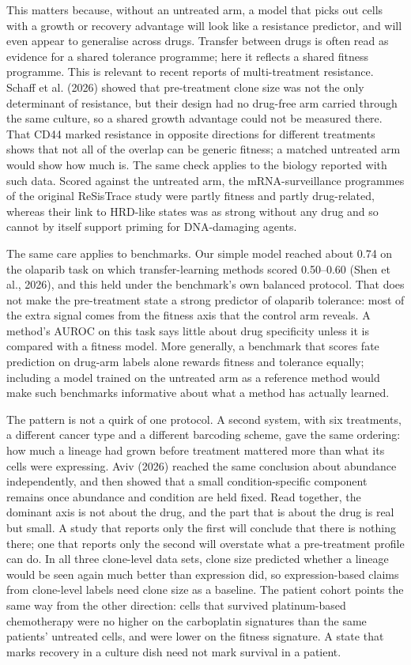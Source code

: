 \documentclass[11pt,a4paper]{article}
\begin{document}
This matters because, without an untreated arm, a model that picks out cells with a growth or recovery advantage will look like a resistance predictor, and will even appear to generalise across drugs. Transfer between drugs is often read as evidence for a shared tolerance programme; here it reflects a shared fitness programme. This is relevant to recent reports of multi-treatment resistance. Schaff et al. (2026) showed that pre-treatment clone size was not the only determinant of resistance, but their design had no drug-free arm carried through the same culture, so a shared growth advantage could not be measured there. That CD44 marked resistance in opposite directions for different treatments shows that not all of the overlap can be generic fitness; a matched untreated arm would show how much is. The same check applies to the biology reported with such data. Scored against the untreated arm, the mRNA-surveillance programmes of the original ReSisTrace study were partly fitness and partly drug-related, whereas their link to HRD-like states was as strong without any drug and so cannot by itself support priming for DNA-damaging agents.

The same care applies to benchmarks. Our simple model reached about 0.74 on the olaparib task on which transfer-learning methods scored 0.50--0.60 (Shen et al., 2026), and this held under the benchmark's own balanced protocol. That does not make the pre-treatment state a strong predictor of olaparib tolerance: most of the extra signal comes from the fitness axis that the control arm reveals. A method's AUROC on this task says little about drug specificity unless it is compared with a fitness model. More generally, a benchmark that scores fate prediction on drug-arm labels alone rewards fitness and tolerance equally; including a model trained on the untreated arm as a reference method would make such benchmarks informative about what a method has actually learned.

The pattern is not a quirk of one protocol. A second system, with six treatments, a different cancer type and a different barcoding scheme, gave the same ordering: how much a lineage had grown before treatment mattered more than what its cells were expressing. Aviv (2026) reached the same conclusion about abundance independently, and then showed that a small condition-specific component remains once abundance and condition are held fixed. Read together, the dominant axis is not about the drug, and the part that is about the drug is real but small. A study that reports only the first will conclude that there is nothing there; one that reports only the second will overstate what a pre-treatment profile can do. In all three clone-level data sets, clone size predicted whether a lineage would be seen again much better than expression did, so expression-based claims from clone-level labels need clone size as a baseline. The patient cohort points the same way from the other direction: cells that survived platinum-based chemotherapy were no higher on the carboplatin signatures than the same patients' untreated cells, and were lower on the fitness signature. A state that marks recovery in a culture dish need not mark survival in a patient.
\end{document}
